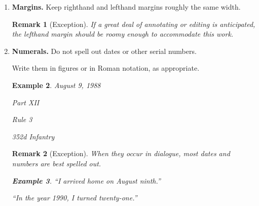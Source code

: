 \documentclass{book}
\numberwithin{equation}{section}
\newtheorem{remark}{Remark}[chapter]
\newtheorem{example}{Example}[chapter]
\begin{document}
\begin{enumerate}
    Common sense will aid you in the decision, but a dictionary is more reliable.
    
    The steady evolution of the language seems to favor union: 2 words eventually become one, usually after a period of hyphenation.
    \begin{example}
        bed chamber $\to$ bed-chamber $\to$ bedchamber
        
        wild life $\to$ wild-life $\to$ wildlife
        
        bell boy $\to$ bell-boy $\to$ bellboy
    \end{example}
    The hyphen can play tricks on the unwary, as it did it Chattanooga when 2 newspapers merged - the \textit{News} and the \textit{Free Press}.
    
    Someone introduced a hyphen into the merger, and the paper became \textit{The Chattanooga News-Free Press}, which sounds as though the paper were news-free, or devoid of news.
    
    Obviously, we ask too much of a hyphen when we ask it to cast its spell over words it does not adjoint.
    \item \textbf{Margins.} Keep righthand and lefthand margins roughly the same width.
    
    \begin{remark}[Exception]
        If a great deal of annotating or editing is anticipated, the lefthand margin should be roomy enough to accommodate this work.
    \end{remark}
    \item \textbf{Numerals.} Do not spell out dates or other serial numbers.
    
    Write them in figures or in Roman notation, as appropriate.
    \begin{example}
        August 9, 1988
        
        Part XII
        
        Rule 3
        
        352d Infantry
    \end{example}

    \begin{remark}[Exception]
        When they occur in dialogue, most dates and numbers are best spelled out.
        \begin{example}
            ``I arrived home on August ninth.''
            
            ``In the year 1990, I turned twenty-one.''
            

\end{example}
\end{remark}
\end{enumerate}
\end{document}
